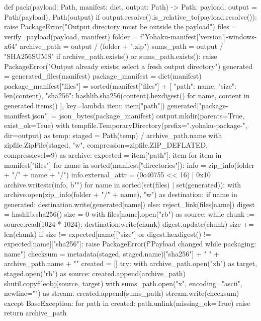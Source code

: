 def pack(payload: Path, manifest: dict, output: Path) -> Path:
    payload, output = Path(payload), Path(output)
    if output.resolve().is_relative_to(payload.resolve()):
        raise PackageError("Output directory must be outside the payload")
    files = verify_payload(payload, manifest)
    folder = f"Yohaku-{manifest['version']}-windows-x64"
    archive_path = output / (folder + ".zip")
    sums_path = output / "SHA256SUMS"
    if archive_path.exists() or sums_path.exists():
        raise PackageError("Output already exists; select a fresh output directory")
    generated = generated_files(manifest)
    package_manifest = dict(manifest)
    package_manifest["files"] = sorted(manifest["files"] + [
        {"path": name, "size": len(content), "sha256": hashlib.sha256(content).hexdigest()}
        for name, content in generated.items()
    ], key=lambda item: item["path"])
    generated["package-manifest.json"] = json_bytes(package_manifest)
    output.mkdir(parents=True, exist_ok=True)
    with tempfile.TemporaryDirectory(prefix=".yohaku-package-", dir=output) as temp:
        staged = Path(temp) / archive_path.name
        with zipfile.ZipFile(staged, "w", compression=zipfile.ZIP_DEFLATED, compresslevel=9) as archive:
            expected = {item["path"]: item for item in manifest["files"]}
            for name in sorted(manifest["directories"]):
                info = zip_info(folder + "/" + name + "/")
                info.external_attr = (0o40755 << 16) | 0x10
                archive.writestr(info, b"")
            for name in sorted(set(files) | set(generated)):
                with archive.open(zip_info(folder + "/" + name), "w") as destination:
                    if name in generated:
                        destination.write(generated[name])
                    else:
                        reject_link(files[name])
                        digest = hashlib.sha256()
                        size = 0
                        with files[name].open("rb") as source:
                            while chunk := source.read(1024 * 1024):
                                destination.write(chunk)
                                digest.update(chunk)
                                size += len(chunk)
                        if size != expected[name]["size"] or digest.hexdigest() != expected[name]["sha256"]:
                            raise PackageError(f"Payload changed while packaging: {name}")
        checksum = metadata(staged, staged.name)["sha256"] + "  " + archive_path.name + "\n"
        created = []
        try:
            with archive_path.open("xb") as target, staged.open("rb") as source:
                created.append(archive_path)
                shutil.copyfileobj(source, target)
            with sums_path.open("x", encoding="ascii", newline="\n") as stream:
                created.append(sums_path)
                stream.write(checksum)
        except BaseException:
            for path in created:
                path.unlink(missing_ok=True)
            raise
    return archive_path


